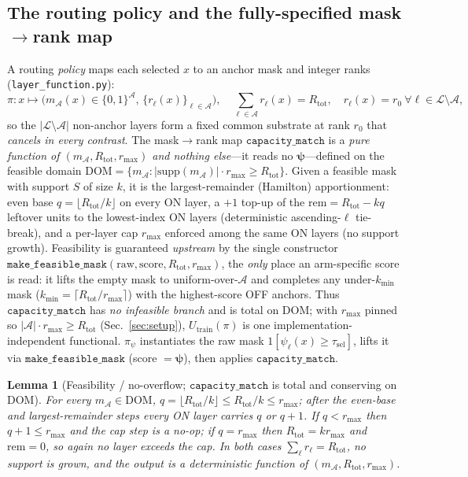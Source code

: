 \documentclass[11pt]{article}
\newtheorem{lemma}{Lemma}
\theoremstyle{definition}
\newcommand{\Aset}{\mathcal{A}}
\newcommand{\Lset}{\mathcal{L}}
\newcommand{\psivec}{\bm{\psi}}
\newcommand{\Rtot}{R_{\mathrm{tot}}}
\newcommand{\rmax}{r_{\max}}
\begin{document}
\subsection{The routing policy and the fully-specified mask$\to$rank map}
\label{sec:policy}
A routing \emph{policy} maps each selected $x$ to an anchor mask and integer ranks
(\texttt{layer\_function.py}):
\begin{equation}
\pi:x\mapsto\Big(m_{\Aset}(x)\in\{0,1\}^{\Aset},\,\{r_\ell(x)\}_{\ell\in\Aset}\Big),\quad
\textstyle\sum_{\ell\in\Aset}r_\ell(x)=\Rtot,\quad r_\ell(x)=r_0\ \forall\ell\in\Lset\setminus\Aset,
\label{eq:pol}
\end{equation}
so the $|\Lset\setminus\Aset|$ non-anchor layers form a fixed common substrate at rank
$r_0$ that \emph{cancels in every contrast}. The mask$\to$rank map $\texttt{capacity\_match}$
is a \emph{pure function of $(m_{\Aset},\Rtot,\rmax)$ and nothing else}---it reads no
$\psivec$---defined on the feasible domain $\mathrm{DOM}=\{m_{\Aset}:|\mathrm{supp}(m_{\Aset})|\cdot
\rmax\ge\Rtot\}$. Given a feasible mask with support $S$ of size $k$, it is the
largest-remainder (Hamilton) apportionment: even base $q=\lfloor\Rtot/k\rfloor$ on every ON
layer, a $+1$ top-up of the $\mathrm{rem}=\Rtot-kq$ leftover units to the lowest-index ON
layers (deterministic ascending-$\ell$ tie-break), and a per-layer cap $\rmax$ enforced
among the same ON layers (no support growth). Feasibility is guaranteed \emph{upstream} by
the single constructor $\texttt{make\_feasible\_mask}(\text{raw},\text{score},\Rtot,\rmax)$,
the \emph{only} place an arm-specific score is read: it lifts the empty mask to
uniform-over-$\Aset$ and completes any under-$k_{\min}$ mask ($k_{\min}=\lceil\Rtot/\rmax\rceil$)
with the highest-score OFF anchors. Thus $\texttt{capacity\_match}$ has \emph{no infeasible
branch} and is total on $\mathrm{DOM}$; with $\rmax$ pinned so $|\Aset|\cdot\rmax\ge\Rtot$
(Sec.~\ref{sec:setup}), $U_{\mathrm{train}}(\pi)$ is one implementation-independent
functional. $\pi_\psi$ instantiates the raw mask $1[\psi_\ell(x)\ge\tau_{\mathrm{sel}}]$,
lifts it via $\texttt{make\_feasible\_mask}$ (score $=\psivec$), then applies
$\texttt{capacity\_match}$.
\begin{lemma}[Feasibility / no-overflow; $\texttt{capacity\_match}$ is total and conserving on $\mathrm{DOM}$]
\label{lem:feas}
For every $m_{\Aset}\in\mathrm{DOM}$, $q=\lfloor\Rtot/k\rfloor\le\Rtot/k\le\rmax$; after the
even-base and largest-remainder steps every ON layer carries $q$ or $q+1$. If $q<\rmax$
then $q+1\le\rmax$ and the cap step is a no-op; if $q=\rmax$ then $\Rtot=k\rmax$ and
$\mathrm{rem}=0$, so again no layer exceeds the cap. In both cases $\sum_{\ell}r_\ell=\Rtot$,
no support is grown, and the output is a deterministic function of $(m_{\Aset},\Rtot,\rmax)$.
\end{lemma}
\end{document}
